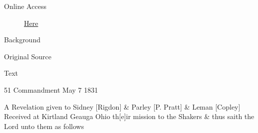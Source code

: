 			\begin{description}
				\item[Online Access] \href{https://www.josephsmithpapers.org/paper-summary/revelation-7-may-1831-dc-49/1}{Here}
			\end{description}
			
			\begin{description}
				\item[Background]
			\end{description}
			
			
			\begin{description}
				\item[Original Source]
			\end{description}
			
			
			\begin{description}
				\item[Text]
			\end{description}
			
				\begin{tightcenter}
				51 Commandment May 7 1831
				\end{tightcenter}
				
				A Revelation given to Sidney [Rigdon] \& Parley [P. Pratt] \& Leman [Copley] Received at Kirtland Geauga Ohio th[e]ir mission to the Shakers \& thus saith the Lord unto them as follows
				
